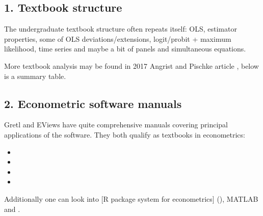 \documentclass[letterpaper,10pt,english]{sphinxmanual}
\begin{document}
\subsection{1. Textbook structure}
\label{\detokenize{how-to-teach/ways-into-econometrics:textbook-structure}}
The undergraduate textbook structure often repeats itself: OLS, estimator
properties, some of OLS deviations/extensions, logit/probit + maximum likelihood,
time series and maybe a bit of panels and simultaneous equations.

More textbook analysis may be found in 2017 Angrist and Pischke article , below is a summary table.



\subsection{2. Econometric software manuals}
\label{\detokenize{how-to-teach/ways-into-econometrics:econometric-software-manuals}}
Gretl and EViews have quite comprehensive manuals covering
principal applications of the software. They both qualify as
textbooks in econometrics:
\begin{itemize}
\item {} 

\item {} 

\item {} 

\item {} 

\end{itemize}

Additionally one can look into {[}R package system for econometrics{]}  (), MATLAB  and .
\end{document}
